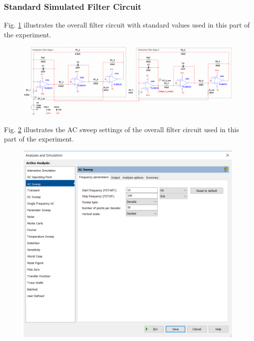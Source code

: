 \documentclass[hidelinks]{article}
\begin{document}
	\pagebreak
	\subsubsection{Standard Simulated Filter Circuit}	
	Fig. \ref{f:overallStand} illustrates the overall filter circuit with standard values used in this part of the experiment.
	\begin{figure}[htbp]
		\centering
		\includegraphics[width=0.7\textheight]{circuit3.png}
		\label{f:overallStand}
	\end{figure}

	\noindent Fig. \ref{f:sim_settings2} illustrates the AC sweep settings of the overall filter circuit used in this part of the experiment.
	\begin{figure}[htbp]
		\centering
		\includegraphics[width=0.65\linewidth]{sim_settings2.png}
		\label{f:sim_settings2}
	\end{figure}	
\end{document}

